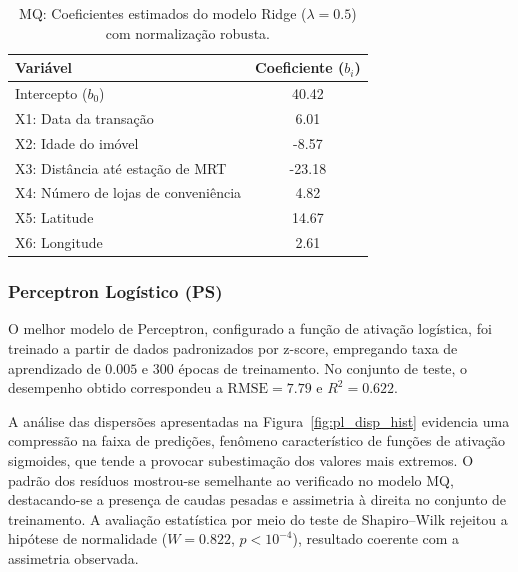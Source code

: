 \begin{table}[h!]

    \centering

    \caption{MQ: Coeficientes estimados do modelo Ridge ($\lambda=0.5$) com normalização robusta.}

    \label{tab:mqo_coef}

    \begin{tabular}{lc}

        \toprule

        \textbf{Variável} & \textbf{Coeficiente ($b_i$)} \\

        \midrule

        Intercepto ($b_0$) & 40.42 \\

        X1: Data da transação & 6.01 \\

        X2: Idade do imóvel & -8.57 \\

        X3: Distância até estação de MRT & -23.18 \\

        X4: Número de lojas de conveniência & 4.82 \\

        X5: Latitude & 14.67 \\

        X6: Longitude & 2.61 \\

        \bottomrule

    \end{tabular}

\end{table}



\subsubsection{Perceptron Logístico (PS)}

O melhor modelo de Perceptron, configurado a função de ativação logística, foi treinado a partir de dados padronizados por z-score, empregando taxa de aprendizado de $0.005$ e $300$ épocas de treinamento. No conjunto de teste, o desempenho obtido correspondeu a $\mathrm{RMSE}=7.79$ e $R^2=0.622$.

A análise das dispersões apresentadas na Figura~\ref{fig:pl_disp_hist} evidencia uma compressão na faixa de predições, fenômeno característico de funções de ativação sigmoides, que tende a provocar subestimação dos valores mais extremos. O padrão dos resíduos mostrou-se semelhante ao verificado no modelo MQ, destacando-se a presença de caudas pesadas e assimetria à direita no conjunto de treinamento. A avaliação estatística por meio do teste de Shapiro--Wilk rejeitou a hipótese de normalidade ($W=0.822$, $p<10^{-4}$), resultado coerente com a assimetria observada. 

